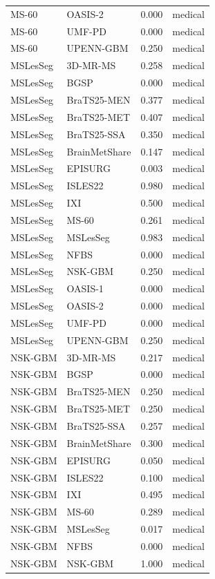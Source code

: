 \begin{tabular}{llrl}
MS-60 & OASIS-2 & 0.000 & medical \\
MS-60 & UMF-PD & 0.000 & medical \\
MS-60 & UPENN-GBM & 0.250 & medical \\
MSLesSeg & 3D-MR-MS & 0.258 & medical \\
MSLesSeg & BGSP & 0.000 & medical \\
MSLesSeg & BraTS25-MEN & 0.377 & medical \\
MSLesSeg & BraTS25-MET & 0.407 & medical \\
MSLesSeg & BraTS25-SSA & 0.350 & medical \\
MSLesSeg & BrainMetShare & 0.147 & medical \\
MSLesSeg & EPISURG & 0.003 & medical \\
MSLesSeg & ISLES22 & 0.980 & medical \\
MSLesSeg & IXI & 0.500 & medical \\
MSLesSeg & MS-60 & 0.261 & medical \\
MSLesSeg & MSLesSeg & 0.983 & medical \\
MSLesSeg & NFBS & 0.000 & medical \\
MSLesSeg & NSK-GBM & 0.250 & medical \\
MSLesSeg & OASIS-1 & 0.000 & medical \\
MSLesSeg & OASIS-2 & 0.000 & medical \\
MSLesSeg & UMF-PD & 0.000 & medical \\
MSLesSeg & UPENN-GBM & 0.250 & medical \\
NSK-GBM & 3D-MR-MS & 0.217 & medical \\
NSK-GBM & BGSP & 0.000 & medical \\
NSK-GBM & BraTS25-MEN & 0.250 & medical \\
NSK-GBM & BraTS25-MET & 0.250 & medical \\
NSK-GBM & BraTS25-SSA & 0.257 & medical \\
NSK-GBM & BrainMetShare & 0.300 & medical \\
NSK-GBM & EPISURG & 0.050 & medical \\
NSK-GBM & ISLES22 & 0.100 & medical \\
NSK-GBM & IXI & 0.495 & medical \\
NSK-GBM & MS-60 & 0.289 & medical \\
NSK-GBM & MSLesSeg & 0.017 & medical \\
NSK-GBM & NFBS & 0.000 & medical \\
NSK-GBM & NSK-GBM & 1.000 & medical \\

\end{tabular}

